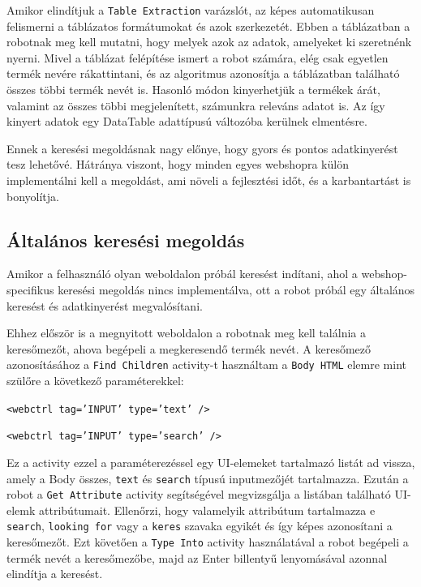 \documentclass[
]{thesis-ekf}
\theoremstyle{definition}
\theoremstyle{remark}
\begin{document}
Amikor elindítjuk a \texttt{Table Extraction} varázslót, az képes automatikusan felismerni a táblázatos formátumokat és azok szerkezetét. Ebben a táblázatban a robotnak meg kell mutatni, hogy melyek azok az adatok, amelyeket ki szeretnénk nyerni. Mivel a táblázat felépítése ismert a robot számára, elég csak egyetlen termék nevére rákattintani, és az algoritmus azonosítja a táblázatban található összes többi termék nevét is. Hasonló módon kinyerhetjük a termékek árát, valamint az összes többi megjelenített, számunkra releváns adatot is. Az így kinyert adatok egy DataTable adattípusú változóba kerülnek elmentésre.

Ennek a keresési megoldásnak nagy előnye, hogy gyors és pontos adatkinyerést tesz lehetővé. Hátránya viszont, hogy minden egyes webshopra külön implementálni kell a megoldást, ami növeli a fejlesztési időt, és a karbantartást is bonyolítja.

\subsection*{Általános keresési megoldás}

Amikor a felhasználó olyan weboldalon próbál keresést indítani, ahol a webshop-specifikus keresési megoldás nincs implementálva, ott a robot próbál egy általános keresést és adatkinyerést megvalósítani.

Ehhez először is a megnyitott weboldalon a robotnak meg kell találnia a keresőmezőt, ahova begépeli a megkeresendő termék nevét. A keresőmező azonosításához a \texttt{Find Children} activity-t használtam a \texttt{Body HTML} elemre mint szülőre a következő paraméterekkel:
\begin{center}
	\texttt{<webctrl tag='INPUT' type='text' />}
	
	\texttt{<webctrl tag='INPUT' type='search' />}
\end{center}
Ez a activity ezzel a paraméterezéssel egy UI-elemeket tartalmazó listát ad vissza, amely a Body összes, \texttt{text} és \texttt{search} típusú inputmezőjét tartalmazza. Ezután a robot a \texttt{Get Attribute} activity segítségével megvizsgálja a listában található UI-elemk attribútumait. Ellenőrzi, hogy valamelyik attribútum tartalmazza e \texttt{search}, \texttt{looking for} vagy a \texttt{keres} szavaka egyikét és így képes azonosítani a keresőmezőt. Ezt követően a \texttt{Type Into} activity használatával a robot begépeli a termék nevét a keresőmezőbe, majd az Enter billentyű lenyomásával azonnal elindítja a keresést.
\end{document}
